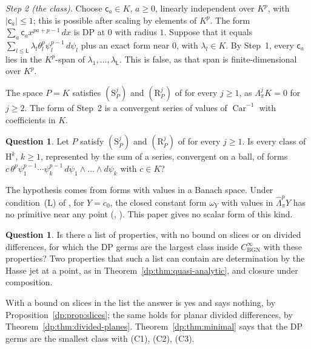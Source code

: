 \documentclass[11pt]{amsart}
\theoremstyle{definition}
\theoremstyle{remark}
\numberwithin{equation}{section}
\newcommand{\abs}[1]{\lvert #1\rvert}
\theoremstyle{plain}
\theoremstyle{definition}
\newtheorem{question}[theorem]{Question}
\theoremstyle{plain}
\newcommand{\hLambda}{\widehat\Lambda}
\begin{document}
\emph{Step 2 (the class).} Choose $\mathsf c_a\in K$, $a\ge0$, linearly independent over $K^p$, with $\abs{\mathsf c_a}\le1$; this is possible after scaling by elements of $K^p$. The form $\sum_a\mathsf c_ax^{pa+p-1}\,dx$ is DP at $0$ with radius $1$. Suppose that it equals $\sum_{l\le\mathsf L}\lambda_l\theta_l^p\psi_l^{p-1}\,d\psi_l$ plus an exact form near $0$, with $\lambda_l\in K$. By Step~1, every $\mathsf c_a$ lies in the $K^p$-span of $\lambda_1,\dots,\lambda_{\mathsf L}$. This is false, as that span is finite-dimensional over $K^p$.

The space $P=K$ satisfies $(\mathrm S^j_P)$ and $(\mathrm R^j_P)$ of \cite[Section~3]{I} for every $j\ge1$, as $\Lambda^j_\pi K=0$ for $j\ge2$. The form of Step~2 is a convergent series of values of $\operatorname{Car}^{-1}$ with coefficients in $K$.

\begin{question}\label{dp:q:cartier}
Let $P$ satisfy $(\mathrm S^j_P)$ and $(\mathrm R^j_P)$ of \cite[Section~3]{I} for every $j\ge1$. Is every class of $\mathrm H^k$, $k\ge1$, represented by the sum of a series, convergent on a ball, of forms $c\,\theta^p\psi_1^{p-1}\cdots\psi_k^{p-1}\,d\psi_1\wedge\dots\wedge d\psi_k$ with $c\in K$?
\end{question}

The hypothesis comes from forms with values in a Banach space. Under condition~(L) of \cite[Section~7.1]{I}, for $Y=c_0$, the closed constant form $\omega_Y$ with values in $\hLambda^p_\pi Y$ has no primitive near any point (\cite[Proposition~10.9]{I}, \cite[Theorem~7.7]{I}). This paper gives no scalar form of this kind.

\begin{question}\label{dp:q:largest}
Is there a list of properties, with no bound on slices or on divided differences, for which the DP germs are the largest class inside $C^\infty_{\mathrm{BGN}}$ with these properties? Two properties that such a list can contain are determination by the Hasse jet at a point, as in Theorem~\ref{dp:thm:quasi-analytic}, and closure under composition.
\end{question}

With a bound on slices in the list the answer is yes and says nothing, by Proposition~\ref{dp:prop:slices}; the same holds for planar divided differences, by Theorem~\ref{dp:thm:divided-planes}. Theorem~\ref{dp:thm:minimal} says that the DP germs are the smallest class with (C1), (C2), (C3).
\appendix
\end{document}
